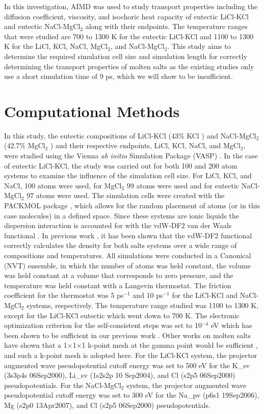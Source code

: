 \documentclass[review]{elsarticle}
\begin{document}
In this investigation, AIMD was used to study transport properties including the diffusion coefficient, viscosity, and isochoric heat capacity of eutectic LiCl-KCl and eutectic NaCl-MgCl$_2$ along with their endpoints. The temperature ranges that were studied are 700 to 1300 K for the eutectic LiCl-KCl and 1100 to 1300 K for the LiCl, KCl, NaCl, MgCl$_2$, and NaCl-MgCl$_2$. This study aims to determine the required simulation cell size and simulation length for correctly determining the transport properties of molten salts as the existing studies \cite{Bengston2014} only use a short simulation time of 9 ps, which we will show to be insufficient.

\section{Computational Methods}

In this study, the eutectic compositions of LiCl-KCl (43\% KCl \cite{Zhou2017}) and NaCl-MgCl$_2$ (42.7\% MgCl$_{2}$ \cite{FTsalt}) and their respective endpoints, LiCl, KCl, NaCl, and MgCl$_2$, were studied using the Vienna \textit{ab initio} Simulation Package (VASP) \cite{Kresse1993,Kresse1996,Kresse1996a}. In the case of eutectic LiCl-KCl, the study was carried out for both 100 and 200 atom systems to examine the influence of the simulation cell size. For LiCl, KCl, and NaCl, 100 atoms were used, for MgCl$_2$ 99 atoms were used and for eutectic NaCl-MgCl$_2$ 97 atoms were used. The simulation cells were created with the PACKMOL package \cite{martinez2009}, which allows for the random placement of atoms (or in this case molecules) in a defined space. Since these systems are ionic liquids the dispersion interaction is accounted for with the vdW-DF2 van der Waals functional \cite{Dion2004}. In previous work \cite{duemmler_liclkcl,duemmler_naclmgcl}, it has been shown that the vdW-DF2 functional correctly calculates the density for both salts systems over a wide range of compositions and temperatures. All simulations were conducted in a Canonical (NVT) ensemble, in which the number of atoms was held constant, the volume was held constant at a volume that corresponds to zero pressure, and the temperature was held constant with a Langevin thermostat. The friction coefficient for the thermostat was 5 ps$^{-1}$ and 10 ps$^{-1}$ for the LiCl-KCl and NaCl-MgCl$_2$ systems, respectively. The temperature range studied was 1100 to 1300 K, except for the LiCl-KCl eutectic which went down to 700 K. The electronic optimization criterion for the self-consistent steps was set to 10$^{-4}$ eV which has been shown to be sufficient in our previous work \cite{duemmler_naclmgcl}. Other works on molten salts have shown that a 1$\times$1$\times$1 k-point mesh at the gamma point would be sufficient \cite{Song2017, Bengston2014}, and such a k-point mesh is adopted here. For the LiCl-KCl system, the projector augmented wave pseudopotential cutoff energy was set to 500 eV for the K\_{sv} (3s3p4s 06Sep2000), Li\_{sv} (1s2s2p 10 Sep2004), and Cl (s2p5 06Sep2000) pseudopotentials. For the NaCl-MgCl$_2$ system, the projector augmented wave pseudopotential cutoff energy was set to 300 eV for the Na\_{pv} (p6s1 19Sep2006), Mg (s2p0 13Apr2007), and Cl (s2p5 06Sep2000) pseudopotentials.
\end{document}
